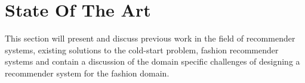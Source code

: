 
\chapter{State Of The Art}
\minitoc
\label{chapter:SotA}
This section will present and discuss previous work in the field of recommender
systems, existing solutions to the cold-start problem, fashion recommender
systems and contain a discussion of the domain specific challenges of designing
a recommender system for the fashion domain.

\clearpage






